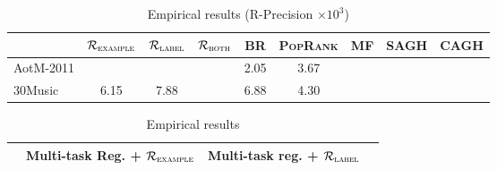 \begin{table}[!h]
\centering
\caption{Empirical results (R-Precision $\times 10^3$)}
\small
\begin{tabular}{l|cccccccc}
\toprule
{}            & $\mathcal{R}_\textsc{example}$ & $\mathcal{R}_\textsc{label}$ & $\mathcal{R}_\textsc{both}$ & BR & \textsc{PopRank} & MF & SAGH & CAGH \\
\midrule
AotM-2011     &  &  &  & 2.05 & 3.67 & & & \\
30Music       & 6.15 & 7.88 &  & 6.88 & 4.30 & & & \\
\bottomrule
\end{tabular}
\end{table}

\begin{table}[!h]
\centering
\caption{Empirical results}
\begin{tabular}{l|ccc}
\toprule
{}            & Multi-task Reg. + $\mathcal{R}_\textsc{example}$ & Multi-task reg. + $\mathcal{R}_\textsc{label}$ \\
\midrule
\bottomrule
\end{tabular}
\end{table}
